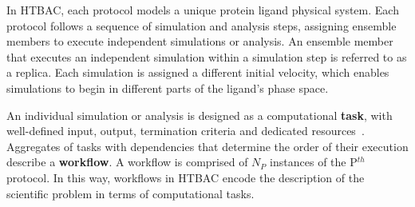 In HTBAC, each protocol models a unique protein ligand physical system. Each
protocol follows a sequence of simulation and analysis steps, assigning
ensemble members to execute independent simulations or analysis. An ensemble
member that executes an independent simulation within a simulation step is
referred to as a replica. Each simulation is assigned a different initial
velocity, which enables simulations to begin in different parts of the
ligand's phase space.

An individual simulation or analysis is designed as a computational
\textbf{task}, with well-defined input, output, termination criteria and
dedicated resources~\cite{power-of-many17}. Aggregates of tasks with
dependencies that determine the order of their execution describe a
\textbf{workflow}. A workflow is comprised of $N_P$ instances of the P$^{th}$
protocol. In this way, workflows in HTBAC encode the description of the
scientific problem in terms of computational tasks.










